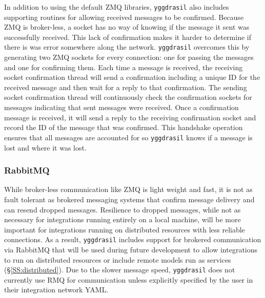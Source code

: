 \documentclass[journal]{IEEEtran}
\newcommand{\pkg}{{\tt yggdrasil}{}}
\begin{document}
In addition to using the default ZMQ libraries, {\pkg} also includes supporting routines for allowing received messages to be confirmed. Because ZMQ is broker-less, a socket has no way of knowing if the message it sent was successfully received. This lack of confirmation makes it harder to determine if there is was error somewhere along the network. {\pkg} overcomes this by generating two ZMQ sockets for every connection: one for passing the messages and one for confirming them. Each time a message is received, the receiving socket confirmation thread will send a confirmation including a unique ID for the received message and then wait for a reply to that confirmation. The sending socket confirmation thread will continuously check the confirmation sockets for messages indicating that sent messages were received. Once a confirmation message is received, it will send a reply to the receiving confirmation socket and record the ID of the message that was confirmed. This handshake operation ensures that all messages are accounted for so {\pkg} knows if a message is lost and where it was lost.


\subsubsection{RabbitMQ}\label{SSS:rmq}
%
While broker-less communication like ZMQ is light weight and fast, it is not as fault tolerant as brokered messaging systems that confirm message delivery and can resend dropped messages. Resilience to dropped messages, while not as necessary for integrations running entirely on a local machine, will be more important for integrations running on distributed resources with less reliable connections. As a result, {\pkg} includes support for brokered communication via RabbitMQ \citep[RMQ][]{RMQ} that will be used during future development to allow integrations to run on distributed resources or include remote models run as services (\S\ref{SS:distributed}). Due to the slower message speed, {\pkg} does not currently use RMQ for communication unless explicitly specified by the user in their integration network YAML. 

\end{document}

